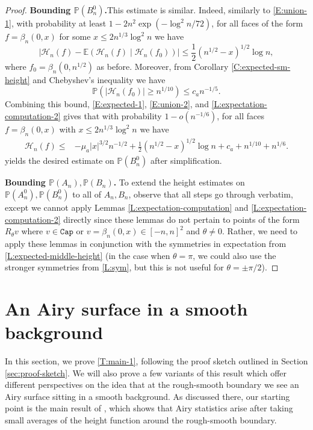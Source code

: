 \documentclass[11pt,twoside]{amsart}
\theoremstyle{plain}
\numberwithin{quest}{section}
\theoremstyle{remark}
\numberwithin{rem}{section}
\theoremstyle{definition}
\renewcommand{\P}{\mathbb{P}}
\newcommand{\E}{\mathbb{E}}
\newcommand{\cH}{\mathcal{H}}
\renewcommand{\tt}[1]{{\mathtt{#1}}}
\begin{document}
\begin{proof}
		\textbf{Bounding $\P(B_n^0)$.}\qquad This estimate is similar. Indeed, similarly to \eqref{E:union-1}, with probability at least $1 - 2n^2 \exp(-\log^2 n/72)$, for all faces of the form $f = \beta_n(0, x)$ for some $x \le 2 n^{1/3} \log^2 n$ we have
		\begin{equation}
			\label{E:union-2}
			|\mathcal{H}_n(f) - \E (\cH_n(f) \mid \cH_n(f_0))| \le \frac{1}{2}(n^{1/2} - x)^{1/2} \log n,
		\end{equation}
		where $f_0 = \beta_n(0, n^{1/2})$ as before. Moreover, from Corollary \ref{C:expected-sm-height} and Chebyshev's inequality we have
		\begin{equation*}
			\P(|\cH_n(f_0)| \ge n^{1/10}) \le c_a n^{-1/5}.  
		\end{equation*}
		Combining this bound, \eqref{E:expected-1}, \eqref{E:union-2}, and \cref{L:expectation-computation-2} gives that with probability $1 - o(n^{-1/6})$, for all faces $f = \beta_n(0, x)$ with $x \le 2 n^{1/3} \log^2 n$ we have
		\begin{align*}
			\mathcal{H}_n(f)
			\le &- \mu_a |x|^{3/2} n^{-1/2} + \frac{1}{2}(n^{1/2} - x)^{1/2} \log n + c_a + n^{1/10} + n^{1/6}.
		\end{align*}
		yields the desired estimate on $\P(B_n^0)$ after simplification.
		
		\textbf{Bounding $\P(A_n), \P(B_n)$.} \qquad To extend the height estimates on $\P(A_n^0), \P(B_n^0)$ to all of $A_n, B_n$, observe that all steps go through verbatim, except we cannot apply Lemmas \ref{L:expectation-computation} and \ref{L:expectation-computation-2} directly since these lemmas do not pertain to points of the form $R_\theta v$ where $v \in \tt{Cap}$ or $v = \beta_n(0, x) \in [-n, n]^2$  and $\theta \ne 0$. Rather, we need to apply these lemmas in conjunction with the symmetries in expectation from \cref{L:expected-middle-height} (in the case when $\theta = \pi$, we could also use the stronger symmetries from \cref{L:sym}, but this is not useful for $\theta = \pm \pi/2$).
	\end{proof}
	
	
	
	\section{An Airy surface in a smooth background}
	\label{S:proof-t1}
	
	In this section, we prove \cref{T:main-1}, following the proof sketch outlined in Section \ref{sec:proof-sketch}. We will also prove a few variants of this result which offer different perspectives on the idea that at the rough-smooth boundary we see an Airy surface sitting in a smooth background. As discussed there, our starting point is the main result of \cite{BCJ18}, which shows that Airy statistics arise after taking small averages of the height function around the rough-smooth boundary. 
	
\end{document}
